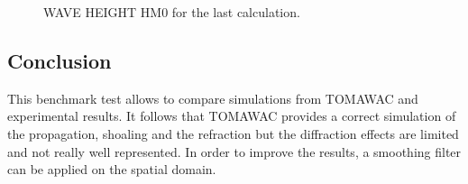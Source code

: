 \begin{figure}[H]
  \centering
      \caption{WAVE HEIGHT HM0 for the last calculation.}
\label{resultshoal}
\end{figure}

\subsection{Conclusion}
This benchmark test allows to compare simulations from TOMAWAC and experimental results. It follows that TOMAWAC provides a correct simulation of the propagation, shoaling and the refraction but the diffraction effects are limited and not really well represented. In order to improve the results, a smoothing filter can be applied on the spatial domain.\\
